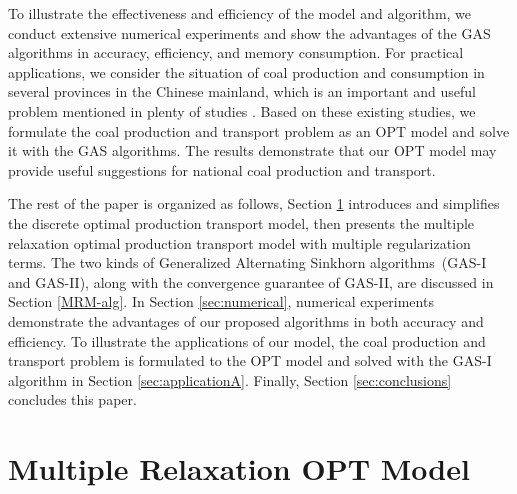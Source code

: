 \documentclass[review,hidelinks,onefignum,onetabnum]{siamart220329}
\begin{document}
To illustrate the effectiveness and efficiency of the model and algorithm, we conduct extensive numerical experiments and show the advantages of the GAS algorithms in accuracy, efficiency, and memory consumption. 
For practical applications, we consider the situation of coal production and consumption in several provinces in the Chinese mainland, which is an important and useful problem mentioned in plenty of studies \cite{kantorovich1960mathematical,cao2006coal,kozan2012demand}. 
Based on these existing studies, we formulate the coal production and transport problem as an OPT model and solve it with the GAS algorithms. 
The results demonstrate that our OPT model may provide useful suggestions for national coal production and transport. 

 

The rest of the paper is organized as follows, Section \ref{sec:MRM} introduces and simplifies the discrete optimal production transport model, then presents the multiple relaxation optimal production transport model with multiple regularization terms. 
The two kinds of Generalized Alternating Sinkhorn algorithms~(GAS-I and GAS-II), along with the convergence guarantee of GAS-II, are discussed in Section \ref{MRM-alg}. 
In Section \ref{sec:numerical}, numerical experiments demonstrate the advantages of our proposed algorithms in both accuracy and efficiency. To illustrate the applications of our model, the coal production and transport problem is formulated to the OPT model and solved with the GAS-I algorithm in Section \ref{sec:applicationA}. Finally, Section \ref{sec:conclusions} concludes this paper.






\section{Multiple Relaxation OPT Model}
\label{sec:MRM}
 
\end{document}
